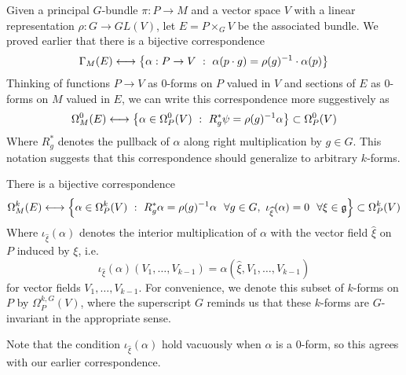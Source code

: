 Given a principal $G$-bundle $\pi : P \to M$ and a vector space $V$ with
a linear representation $\rho : G \to GL(V)$, let $E = P \times_G V$ be the
associated bundle. We proved earlier that there is a bijective correspondence
\[
\Gamma_M(E) \longleftrightarrow
\left\lbrace \alpha : P \to V ~:~ \alpha(p \cdot g) = \rho(g)^{-1} \cdot \alpha(p) \right\rbrace
\]
Thinking of functions $P \to V$ as $0$-forms on $P$ valued in $V$ and sections
of $E$ as $0$-forms on $M$ valued in $E$, we can write this correspondence more
suggestively as
\[
\Omega_M^0(E) \longleftrightarrow
\left\lbrace \alpha \in \Omega_P^0(V) ~:~ R_g^*\psi = \rho(g)^{-1}\alpha \right\rbrace \subset \Omega_P^0(V)
\]
Where $R_g^*$ denotes the pullback of $\alpha$ along right multiplication by
$g \in G$. This notation suggests that this correspondence should generalize
to arbitrary $k$-forms.
%
\begin{prop}
There is a bijective correspondence
\[
\Omega_M^k(E) \longleftrightarrow
\left\lbrace \alpha \in \Omega_P^k(V) ~:~ R_g^*\alpha = \rho(g)^{-1}\alpha ~~\forall g \in G,~
\iota_{\widehat{\xi}}(\alpha) = 0 ~~\forall \xi \in \mathfrak{g} \right\rbrace \subset \Omega_P^k(V)
\]
Where $\iota_{\widehat{\xi}}(\alpha)$  denotes the interior multiplication
of $\alpha$ with the vector field $\widehat{\xi}$ on $P$ induced by $\xi$, i.e.
\[
\iota_{\widehat{\xi}}(\alpha)(V_1, \ldots, V_{k-1}) =
\alpha(\widehat{\xi}, V_1, \ldots, V_{k-1})
\]
for vector fields $V_1, \ldots , V_{k-1}$. For convenience, we denote this
subset of $k$-forms on $P$ by $\Omega^{k,G}_P(V)$, where the superscript $G$
reminds us that these $k$-forms are $G$-invariant in the appropriate sense.
\end{prop}
%
\begin{rem*}
Note that the condition $\iota_{\widehat{\xi}}(\alpha)$ hold vacuously when
$\alpha$ is a $0$-form, so this agrees with our earlier correspondence.
\end{rem*}
%
